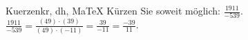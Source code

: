 \begin{MAufgabe}{Kuerzen}{kr, dh, MaTeX}
K\"urzen Sie soweit m\"oglich: $\frac{1911}{-539}$.\\ 
\ifLsg\MLoesung
\quad $\frac{1911}{-539}=\frac{(49)\cdot(39)}{(49)\cdot(-11)}=\frac{39}{-11}=\frac{-39}{11}$.\else\relax\fi
 \end{MAufgabe}